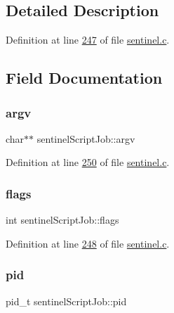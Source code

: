 \subsection{Detailed Description}


Definition at line \hyperlink{sentinel_8c_source_l00247}{247} of file \hyperlink{sentinel_8c_source}{sentinel.\+c}.



\subsection{Field Documentation}
\mbox{\label{structsentinelScriptJob_a22239ba0586d6dfc9ec851770c4a037f}} 
\subsubsection{\texorpdfstring{argv}{argv}}
{\footnotesize\ttfamily char$\ast$$\ast$ sentinel\+Script\+Job\+::argv}



Definition at line \hyperlink{sentinel_8c_source_l00250}{250} of file \hyperlink{sentinel_8c_source}{sentinel.\+c}.

\mbox{\label{structsentinelScriptJob_ab4c41e8ccf4d10724e60e31c2afef66d}} 
\subsubsection{\texorpdfstring{flags}{flags}}
{\footnotesize\ttfamily int sentinel\+Script\+Job\+::flags}



Definition at line \hyperlink{sentinel_8c_source_l00248}{248} of file \hyperlink{sentinel_8c_source}{sentinel.\+c}.

\mbox{\label{structsentinelScriptJob_af4d221bd4ff2ba04b2be3b17360ae4c1}} 
\subsubsection{\texorpdfstring{pid}{pid}}
{\footnotesize\ttfamily pid\+\_\+t sentinel\+Script\+Job\+::pid}



